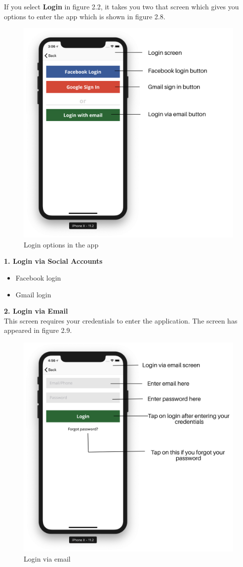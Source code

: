 \begin{itemize}
    
    If you select \textbf{Login} in figure 2.2, it takes you two that screen which gives you options to enter the app which is shown in figure 2.8.
    
    \begin{figure}[H]
            \centering
            \includegraphics[width=0.50\linewidth]{figures/ch2/loginOptions.png}
            \caption{\label{fig:loginOptions} Login options in the app}
    \end{figure}
    
     \textbf{1. Login via Social Accounts}
     \begin{itemize}
         \item Facebook login
         \item Gmail login
     \end{itemize}
   
     \textbf{2. Login via Email} \\
    This screen requires your credentials to enter the application. The screen has appeared in figure 2.9.
     
     \begin{figure}[H]
            \centering
            \includegraphics[width=0.50\linewidth]{figures/ch2/login_email.png}
            \caption{\label{fig:login_email} Login via email}
    \end{figure}
    

\end{itemize}
